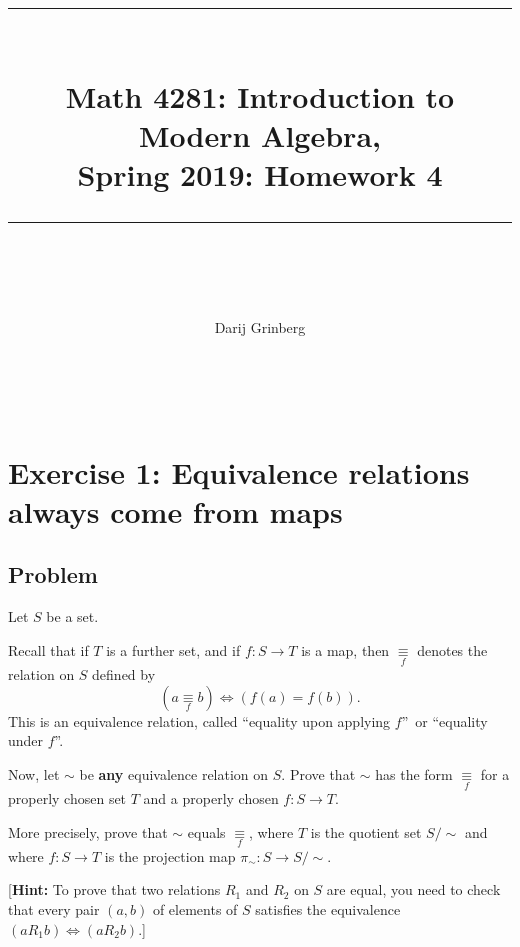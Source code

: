 \documentclass[paper=a4, fontsize=12pt]{scrartcl}%
\theoremstyle{plainsl}
\theoremstyle{definition}
\theoremstyle{remark}
\begin{document}
\title{ \\[25pt] \rule{\linewidth}{0.5pt} \\[0.4cm] {\huge Math 4281: Introduction to Modern Algebra, }\\Spring 2019: Homework 4\\\rule{\linewidth}{2pt} \\[0.5cm] }
\author{Darij Grinberg}
\maketitle

\rule{0pt}{0.3pt} \\[0.4cm]

\section{Exercise 1: Equivalence relations always come from maps}

\subsection{Problem}

Let $S$ be a set.

Recall that if $T$ is a further set, and if $f:S\rightarrow T$ is a map, then
$\underset{f}{\equiv}$ denotes the relation on $S$ defined by
\[
\left(  a\underset{f}{\equiv}b\right)  \iff\left(  f\left(  a\right)
=f\left(  b\right)  \right)  .
\]
This is an equivalence relation, called \textquotedblleft equality upon
applying $f$\textquotedblright\ or \textquotedblleft equality under
$f$\textquotedblright.

Now, let $\sim$ be \textbf{any} equivalence relation on $S$. Prove that $\sim$
has the form $\underset{f}{\equiv}$ for a properly chosen set $T$ and a
properly chosen $f : S \to T$.

More precisely, prove that $\sim$ equals $\underset{f}{\equiv}$, where $T$ is
the quotient set $S / \sim$ and where $f : S \to T$ is the projection map
$\pi_{\sim}: S \to S / \sim$.

[\textbf{Hint:} To prove that two relations $R_{1}$ and $R_{2}$ on $S$ are
equal, you need to check that every pair $\left(  a, b \right)  $ of elements
of $S$ satisfies the equivalence $\left(  a R_{1} b \right)  \iff\left(  a
R_{2} b \right)  $.]
\end{document}
